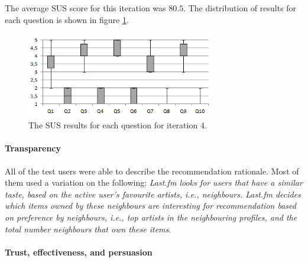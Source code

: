 The average SUS score for this iteration was $80.5$. The distribution of results for each question is shown in figure \ref{fig:iterations_sus_scores_it4_boxplots}.

\begin{figure}
	\begin{center}
		\includegraphics[width=8.3cm]{img/iterations_sus_scores_it4_boxplots}
	\end{center}
	\caption{The SUS results for each question for iteration 4.}
	\label{fig:iterations_sus_scores_it4_boxplots}
\end{figure}


\paragraph{Transparency}

All of the test users were able to describe the recommendation rationale. Most of them used a variation on the following: \textit{Last.fm looks for users that have a similar taste, based on the active user's favourite artists, i.e., neighbours. Last.fm decides which items owned by these neighbours are interesting for recommendation based on preference by neighbours, i.e., top artists in the neighbouring profiles, and the total number neighbours that own these items}.


\paragraph{Trust, effectiveness, and persuasion}

